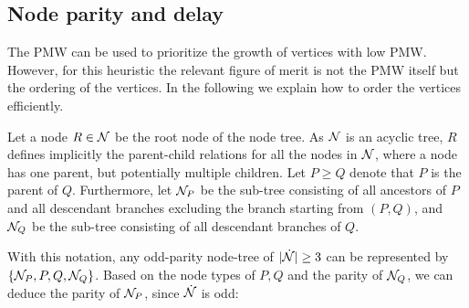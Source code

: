\subsection{Node parity and delay}\label{sec:paritydelay}
The PMW can be used to prioritize the growth of vertices with low PMW. However, for this heuristic the relevant figure of merit is not the PMW itself but the ordering of the vertices. In the following we explain how to order the vertices efficiently.



Let a node $R\in \mathcal{N}$ be the root node of the node tree. As $\mathcal{N}$ is an acyclic tree, $R$ defines implicitly the parent-child relations for all the nodes in $\mathcal{N}$, where a node has one parent, but potentially multiple children. Let $P\geq Q$ denote that $P$ is the parent of $Q$. Furthermore, let $\mathcal{N}_P$ be the sub-tree consisting of all ancestors of $P$ and all descendant branches excluding the branch starting from $(P,Q)$, and $\mathcal{N}_Q$ be the sub-tree consisting of all descendant branches of $Q$. 

With this notation, any odd-parity node-tree of $\lvert\dot{\mathcal{N}}\rvert\geq 3$ can be represented by $\{\mathcal{N}_P,P,Q,\mathcal{N}_Q\}$. %
Based on the node types of $P,Q$ and the parity of $\mathcal{N}_Q$, we can deduce the parity of $\mathcal{N}_P$, since $\dot{\mathcal{N}}$ is odd: 

